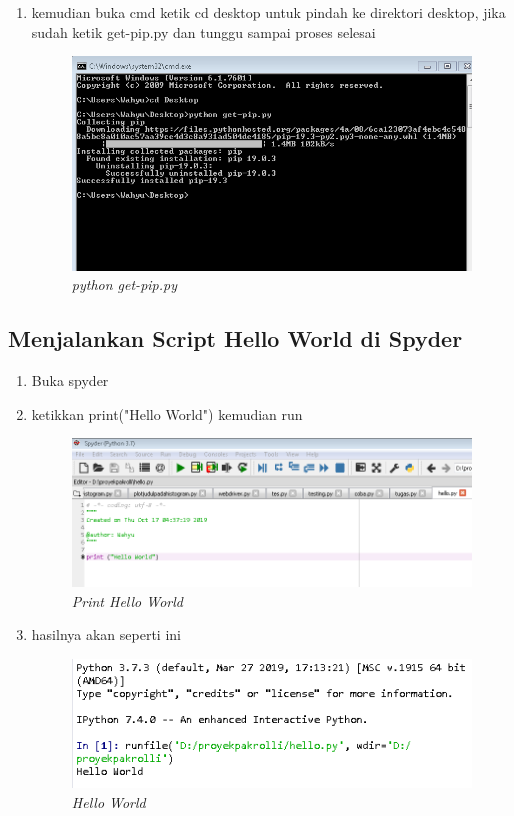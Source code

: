 \begin{enumerate}
\item kemudian buka cmd ketik cd desktop untuk pindah ke direktori desktop, jika sudah ketik get-pip.py dan tunggu sampai proses selesai
\begin{figure}[H]
    \centering
    \includegraphics[scale=0.5]{figures/b4}
    \caption{\textit{python get-pip.py}}
    \label{getpip}
\end{figure}
\end{enumerate}

\subsection{Menjalankan Script Hello World di Spyder}
\begin{enumerate}
\item Buka spyder


\item ketikkan print("Hello World") kemudian run
\begin{figure}[H]
    \centering
    \includegraphics[scale=0.6]{figures/a8}
    \caption{\textit{Print Hello World}}
    \label{Print Hello World}
\end{figure}

\item hasilnya akan seperti ini
\begin{figure}[H]
    \centering
    \includegraphics[scale=0.6]{figures/a9}
    \caption{\textit{Hello World}}
    \label{Hello World}
\end{figure}
\end{enumerate}


